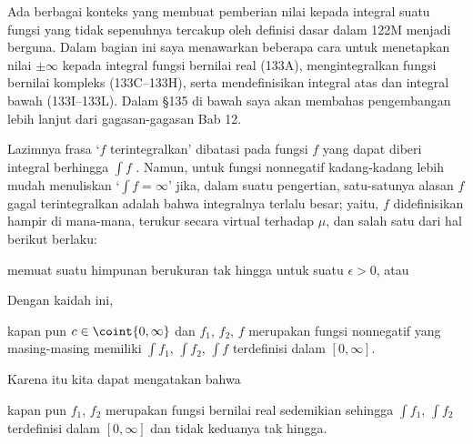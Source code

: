 
\def\chaptername{Pelengkap}
\def\sectionname{Konsep integrasi yang lebih luas}


Ada berbagai konteks yang membuat pemberian nilai kepada integral suatu
fungsi yang tidak sepenuhnya tercakup oleh definisi dasar dalam 122M menjadi
berguna. Dalam bagian ini saya menawarkan beberapa cara untuk menetapkan nilai
$\pm\infty$ kepada integral fungsi bernilai real (133A), mengintegralkan
fungsi bernilai kompleks (133C–133H), serta mendefinisikan integral atas dan
integral bawah (133I–133L). Dalam \S135 di bawah saya akan membahas
pengembangan lebih lanjut dari gagasan-gagasan Bab 12.

 Lazimnya frasa `$f$ terintegralkan'
dibatasi pada fungsi $f$ yang dapat diberi integral berhingga $\int f$
. Namun, untuk fungsi nonnegatif
kadang-kadang lebih mudah menuliskan `$\int f=\infty$' jika, dalam suatu
pengertian, satu-satunya alasan $f$ gagal terintegralkan adalah bahwa
integralnya terlalu besar; yaitu, $f$ didefinisikan hampir di mana-mana,
terukur secara virtual terhadap $\mu$, dan salah satu dari hal berikut berlaku:


\noindent memuat suatu himpunan berukuran tak hingga untuk suatu
$\epsilon>0$, atau


\noindent{}Dengan kaidah ini,


\noindent kapan pun $c\in\coint{0,\infty}$ dan $f_1$, $f_2$, $f$ merupakan
fungsi nonnegatif yang masing-masing memiliki $\int f_1$, $\int f_2$,
$\int f$ terdefinisi dalam $[0,\infty]$.

Karena itu kita dapat mengatakan bahwa


\noindent kapan pun $f_1$, $f_2$ merupakan fungsi bernilai real sedemikian
sehingga $\int f_1$, $\int f_2$ terdefinisi dalam $[0,\infty]$ dan tidak
keduanya tak hingga.

